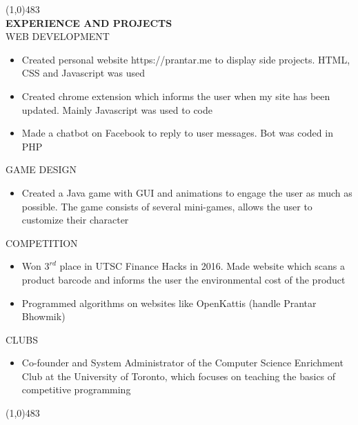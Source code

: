 \documentclass[10pt,oneside]{article}
\begin{document}
        \line(1,0){483}\\
        \large{\textbf{EXPERIENCE AND PROJECTS}}\\
        \large{WEB DEVELOPMENT}\\
        \begin{itemize}
            \item Created personal website https://prantar.me to display side projects. HTML, CSS and Javascript was used
            \item Created chrome extension which informs the user when my site has been updated. Mainly Javascript was used to code
            \item Made a chatbot on Facebook to reply to user messages. Bot was coded in PHP
        \end{itemize}
        \large{GAME DESIGN}\\
        \begin{itemize}
            \item Created a Java game with GUI and animations to engage the user as much as possible. The game consists of several mini-games, allows the user to customize their character
        \end{itemize}
        \large{COMPETITION}
        \begin{itemize}
            \item Won \(3^{rd}\) place in UTSC Finance Hacks in 2016. Made website which scans a product barcode and informs the user the environmental cost of the product
            \item Programmed algorithms on websites like OpenKattis (handle Prantar Bhowmik)
        \end{itemize}
        \large{CLUBS}
        \begin{itemize}
            \item Co-founder and System Administrator of the Computer Science Enrichment Club at the University of Toronto, which focuses on teaching the basics of competitive programming
        \end{itemize}
        \line(1,0){483}
        
\end{document}
